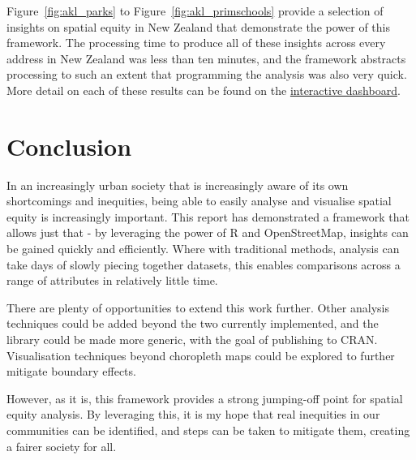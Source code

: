 \documentclass[12pt,a4paper]{article}
\begin{document}
Figure~\ref{fig:akl_parks} to Figure~\ref{fig:akl_primschools} provide a selection of insights on spatial equity in New Zealand that demonstrate the power of this framework. The processing time to produce all of these insights across every address in New Zealand was less than ten minutes, and the framework abstracts processing to such an extent that programming the analysis was also very quick. More detail on each of these results can be found on the \href{https://www.arcgis.com/apps/dashboards/2e46471d956347bcb0a1de8465ad31d7}{interactive dashboard}.

\section{Conclusion}

In an increasingly urban society that is increasingly aware of its own shortcomings and inequities, being able to easily analyse and visualise spatial equity is increasingly important. This report has demonstrated a framework that allows just that - by leveraging the power of R and OpenStreetMap, insights can be gained quickly and efficiently. Where with traditional methods, analysis can take days of slowly piecing together datasets, this enables comparisons across a range of attributes in relatively little time.

There are plenty of opportunities to extend this work further. Other analysis techniques could be added beyond the two currently implemented, and the library could be made more generic, with the goal of publishing to CRAN. Visualisation techniques beyond choropleth maps could be explored to further mitigate boundary effects. 

However, as it is, this framework provides a strong jumping-off point for spatial equity analysis. By leveraging this, it is my hope that real inequities in our communities can be identified, and steps can be taken to mitigate them, creating a fairer society for all.



\end{document}
